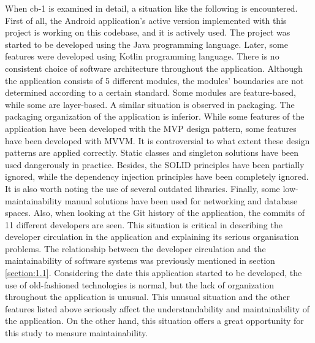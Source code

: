 When cb-1 is examined in detail, a situation like the following is encountered. First of all, the Android application's active version implemented with this project is working on this codebase, and it is actively used. The project was started to be developed using the Java programming language. Later, some features were developed using Kotlin programming language. There is no consistent choice of software architecture throughout the application. Although the application consists of 5 different modules, the modules' boundaries are not determined according to a certain standard. Some modules are feature-based, while some are layer-based. A similar situation is observed in packaging. The packaging organization of the application is inferior. While some features of the application have been developed with the MVP design pattern, some features have been developed with MVVM. It is controversial to what extent these design patterns are applied correctly. Static classes and singleton solutions have been used dangerously in practice. Besides, the SOLID principles have been partially ignored, while the dependency injection principles have been completely ignored. It is also worth noting the use of several outdated libraries. Finally, some low-maintainability manual solutions have been used for networking and database spaces. Also, when looking at the Git history of the application, the commits of 11 different developers are seen. This situation is critical in describing the developer circulation in the application and explaining its serious organisation problems. The relationship between the developer circulation and the maintainability of software systems was previously mentioned in section \ref{section:1.1}. Considering the date this application started to be developed, the use of old-fashioned technologies is normal, but the lack of organization throughout the application is unusual. This unusual situation and the other features listed above seriously affect the understandability and maintainability of the application. On the other hand, this situation offers a great opportunity for this study to measure maintainability.

